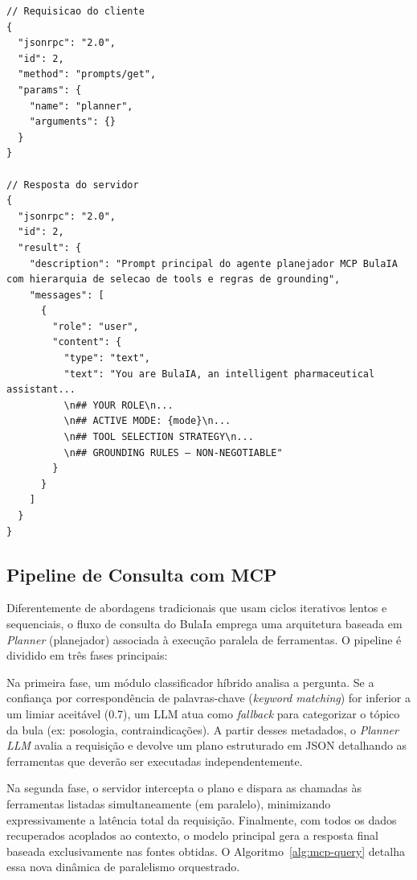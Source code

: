 \documentclass[12pt]{article}
\begin{document}
\begin{lstlisting}[caption={Requisição e resposta para recuperar o prompt orquestrador (planner)}, label={lst:prompt-get}]
// Requisicao do cliente
{
  "jsonrpc": "2.0",
  "id": 2,
  "method": "prompts/get",
  "params": {
    "name": "planner",
    "arguments": {}
  }
}

// Resposta do servidor
{
  "jsonrpc": "2.0",
  "id": 2,
  "result": {
    "description": "Prompt principal do agente planejador MCP BulaIA com hierarquia de selecao de tools e regras de grounding",
    "messages": [
      {
        "role": "user",
        "content": {
          "type": "text",
          "text": "You are BulaIA, an intelligent pharmaceutical assistant...
          \n## YOUR ROLE\n...
          \n## ACTIVE MODE: {mode}\n... 
          \n## TOOL SELECTION STRATEGY\n...
          \n## GROUNDING RULES — NON-NEGOTIABLE"
        }
      }
    ]
  }
}
\end{lstlisting}

\subsection{Pipeline de Consulta com MCP}

Diferentemente de abordagens tradicionais que usam ciclos iterativos lentos e sequenciais, o fluxo de consulta do BulaIa emprega uma arquitetura baseada em \textit{Planner} (planejador) associada à execução paralela de ferramentas. O pipeline é dividido em três fases principais:

Na primeira fase, um módulo classificador híbrido analisa a pergunta. Se a confiança por correspondência de palavras-chave (\textit{keyword matching}) for inferior a um limiar aceitável (0.7), um LLM atua como \textit{fallback} para categorizar o tópico da bula (ex: posologia, contraindicações). A partir desses metadados, o \textit{Planner LLM} avalia a requisição e devolve um plano estruturado em JSON detalhando as ferramentas que deverão ser executadas independentemente.

Na segunda fase, o servidor intercepta o plano e dispara as chamadas às ferramentas listadas simultaneamente (em paralelo), minimizando expressivamente a latência total da requisição. Finalmente, com todos os dados recuperados acoplados ao contexto, o modelo principal gera a resposta final baseada exclusivamente nas fontes obtidas. O Algoritmo~\ref{alg:mcp-query} detalha essa nova dinâmica de paralelismo orquestrado.
\end{document}
